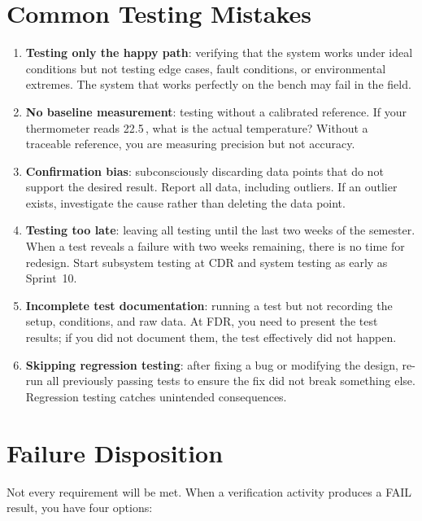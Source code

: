 \section{Common Testing Mistakes}
\begin{enumerate}[nosep,leftmargin=1.5em]
\item \textbf{Testing only the happy path}: verifying that the system works under ideal conditions but not testing edge cases, fault conditions, or environmental extremes. The system that works perfectly on the bench may fail in the field.
\item \textbf{No baseline measurement}: testing without a calibrated reference. If your thermometer reads 22.5\,\degC{}, what is the actual temperature? Without a traceable reference, you are measuring precision but not accuracy.
\item \textbf{Confirmation bias}: subconsciously discarding data points that do not support the desired result. Report all data, including outliers. If an outlier exists, investigate the cause rather than deleting the data point.
\item \textbf{Testing too late}: leaving all testing until the last two weeks of the semester. When a test reveals a failure with two weeks remaining, there is no time for redesign. Start subsystem testing at CDR and system testing as early as Sprint~10.
\item \textbf{Incomplete test documentation}: running a test but not recording the setup, conditions, and raw data. At FDR, you need to present the test results; if you did not document them, the test effectively did not happen.
\item \textbf{Skipping regression testing}: after fixing a bug or modifying the design, re-run all previously passing tests to ensure the fix did not break something else. Regression testing catches unintended consequences.
\end{enumerate}

\section{Failure Disposition}
Not every requirement will be met. When a verification activity produces a FAIL result, you have four options:

